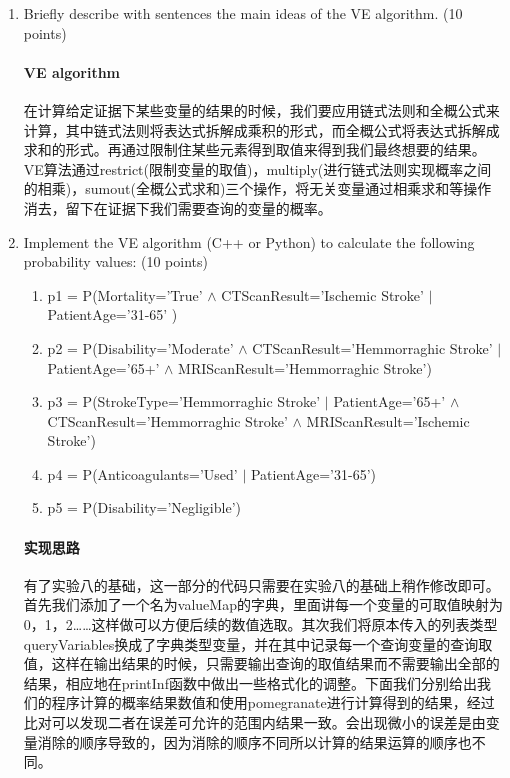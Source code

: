 \documentclass[a4paper, 11pt]{article}
\begin{document}
\begin{enumerate}
\item Briefly describe with sentences the main ideas of  the VE algorithm. (10 points)
\paragraph{VE algorithm}
在计算给定证据下某些变量的结果的时候，我们要应用链式法则和全概公式来计算，其中链式法则将表达式拆解成乘积的形式，而全概公式将表达式拆解成求和的形式。再通过限制住某些元素得到取值来得到我们最终想要的结果。VE算法通过restrict(限制变量的取值)，multiply(进行链式法则实现概率之间的相乘)，sumout(全概公式求和)三个操作，将无关变量通过相乘求和等操作消去，留下在证据下我们需要查询的变量的概率。

\item Implement the VE algorithm (C++ or Python) to calculate the following probability values: (10 points)
    
\begin{enumerate}
\item p1 = P(Mortality='True' $\land$ CTScanResult='Ischemic Stroke' $|$ PatientAge='31-65' )

\item p2 = P(Disability='Moderate' $\land$ CTScanResult='Hemmorraghic Stroke' $|$ PatientAge='65+' $\land$  MRIScanResult='Hemmorraghic Stroke')

\item p3 = P(StrokeType='Hemmorraghic Stroke' $|$ PatientAge='65+' $\land$ CTScanResult='Hemmorraghic Stroke' $\land$ MRIScanResult='Ischemic Stroke')

\item p4 = P(Anticoagulants='Used' $|$ PatientAge='31-65')

\item p5 = P(Disability='Negligible')
\end{enumerate}

\paragraph{实现思路}
有了实验八的基础，这一部分的代码只需要在实验八的基础上稍作修改即可。首先我们添加了一个名为valueMap的字典，里面讲每一个变量的可取值映射为0，1，2……这样做可以方便后续的数值选取。其次我们将原本传入的列表类型queryVariables换成了字典类型变量，并在其中记录每一个查询变量的查询取值，这样在输出结果的时候，只需要输出查询的取值结果而不需要输出全部的结果，相应地在printInf函数中做出一些格式化的调整。下面我们分别给出我们的程序计算的概率结果数值和使用pomegranate进行计算得到的结果，经过比对可以发现二者在误差可允许的范围内结果一致。会出现微小的误差是由变量消除的顺序导致的，因为消除的顺序不同所以计算的结果运算的顺序也不同。


\end{enumerate}
\end{document}
